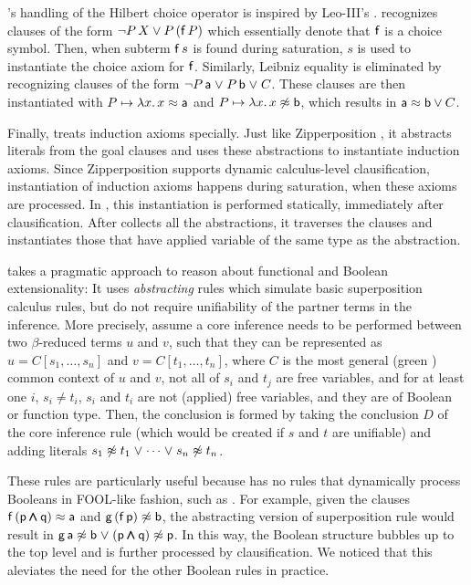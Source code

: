\ehohii{}'s handling of the Hilbert choice operator is inspired by Leo-III's
\cite{sb-21-leo3}. \ehohii{}
recognizes clauses of the form $\neg P \, X \lor P \, (\mathsf{f} \, P)$ which
essentially denote that $\mathsf{f}$ is a choice symbol. Then, when subterm
$\mathsf{f} \, s$ is found during saturation, $s$ is used to instantiate the choice
axiom for $\mathsf{f}$. 
%
Similarly, Leibniz equality \cite{bool-chapter} is eliminated by
recognizing clauses of the form  $\neg P \, \mathsf{a} \mathrel\lor P \, \mathsf{b} \mathrel\lor C$. These clauses are then
instantiated with $P \mapsto \lambda x. \, x \approx \mathsf{a}$ and $P \mapsto \lambda
x. \, x\not\approx\mathsf{b}$, which results in $\mathsf{a} \approx \mathsf{b} \lor C$.

Finally, \ehohii{} treats induction axioms specially. Just like
Zipperposition \cite[Sect.~4]{section-making-ho-work}, it abstracts literals
from the goal clauses and uses these abstractions to instantiate induction
axioms. Since Zipperposition supports dynamic calculus-level clausification,
instantiation of induction axioms happens during saturation, when these axioms
are processed. In \ehohii{}, this instantiation is performed statically,
immediately after clausification. After \ehohii{} collects all the abstractions,
it traverses the clauses and instantiates those that have applied variable of
the same type as the abstraction.

 \ehohii{} takes a pragmatic approach to reason about
functional and Boolean extensionality: It uses \emph{abstracting} rules
\cite{bbtvw-21-sup-lam} which simulate basic superposition calculus rules,
but do not require unifiability of the partner terms in the inference. More
precisely, assume a core inference needs to be performed between two
$\beta$-reduced terms $u$ and $v$, such that they can be represented as
$u=C[s_1, \ldots, s_n]$ and $v=C[t_1, \ldots, t_n]$, where $C$ is the most general
(green \cite{bbtvw-21-sup-lam}) common context of $u$ and $v$, not all of
$s_i$ and $t_j$ are free variables, and for at least one $i$, $s_i \not= t_i$,
$s_i$ and $t_i$ are not (applied) free variables, and they are of Boolean or
function type. Then, the conclusion is formed by taking the conclusion $D$ of
the core inference rule (which would be created if $s$ and $t$ are unifiable)
and adding literals $s_1 \not\approx t_1 \mathrel\lor \cdots \mathrel\lor s_n \not\approx t_n$.

These rules are particularly useful because \ehohii{} has no rules that dynamically
process Booleans in FOOL-like fashion, such as . For example,
given the clauses $\mathsf{f} \, (\mathsf{p} \pmb\land \mathsf{q}) \approx \mathsf{a}$ and
$\mathsf{g} \, (\mathsf{f} \, \mathsf{p}) \not\approx \mathsf{b}$, the abstracting version of
superposition rule would result in $\mathsf{g} \, \mathsf{a} \not\approx \mathsf{b} \mathrel\lor (\mathsf{p}
\pmb\land \mathsf{q}) \not\approx \mathsf{p}$. In this way, the Boolean structure bubbles up to
the top level and is further processed by clausification. We noticed that this
aleviates the need for the other Boolean rules in practice.


